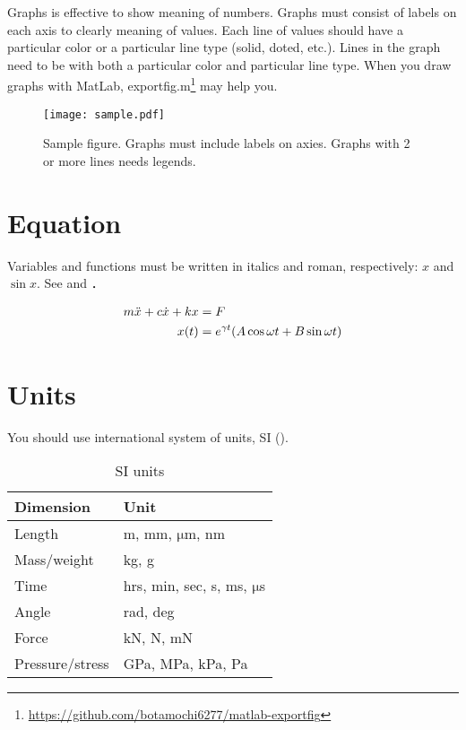 \documentclass[a4,10pt,twocolumn]{article}
\begin{document}
Graphs is effective to show  meaning of numbers. Graphs must consist of labels on each axis to clearly meaning of values. Each line of values should have a particular color or a particular line type (solid, doted, etc.).  Lines in the graph need to be with both a particular color  and particular line type. When you draw graphs with MatLab, \textsf{exportfig.m}\footnote{\url{https://github.com/botamochi6277/matlab-exportfig}} may help you.
\begin{figure}[bp]
	\centering
		\texttt{[image: sample.pdf]}
	\caption{Sample figure. Graphs must include labels on axies. Graphs with 2 or more lines needs legends.
	}
\end{figure}

\section{Equation}\label{task}
Variables and functions must be written in italics and roman, respectively: $x$ and $\sin x$.
See  and ．

\begin{align}
	m\ddot{x} + c\dot{x} + kx &= F \labeq{dynamics}\\
	x(t) &= e^{\gamma t }(A \cos\omega t + B \sin \omega t) \labeq{oscillation}
\end{align}

\section{Units}
You should use international system of units, SI ().
\begin{table}[tb]
\caption{SI units }
\centering
\begin{tabular}{ll}\hline\hline
Dimension &	Unit \\ \hline
Length & m, mm, $\mathrm{\mu}$m, nm \\
Mass/weight & kg, g \\
Time & hrs, min, sec, s, ms, $\mathrm{\mu}$s\\ 
Angle & rad, deg \\ \hline
Force & kN, N, mN \\
Pressure/stress & GPa, MPa, kPa, Pa \\ \hline\hline
\end{tabular}
\end{table}%
\end{document}

